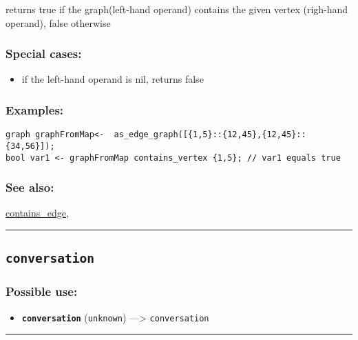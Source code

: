 \documentclass[]{book}
\providecommand{\tightlist}{%
  \setlength{\itemsep}{0pt}\setlength{\parskip}{0pt}}
\theoremstyle{definition}
\theoremstyle{definition}
\theoremstyle{definition}
\theoremstyle{remark}
\begin{document}
returns true if the graph(left-hand operand) contains the given vertex
(righ-hand operand), false otherwise

\subsubsection{Special cases:}\label{special-cases-36}

\begin{itemize}
\tightlist
\item
  if the left-hand operand is nil, returns false
\end{itemize}

\subsubsection{Examples:}\label{examples-80}

\begin{verbatim}
graph graphFromMap<-  as_edge_graph([{1,5}::{12,45},{12,45}::{34,56}]);  
bool var1 <- graphFromMap contains_vertex {1,5}; // var1 equals true
\end{verbatim}

\subsubsection{See also:}\label{see-also-66}

\href{OperatorsBC\#contains_edge}{contains\_edge},

\begin{center}\rule{0.5\linewidth}{\linethickness}\end{center}

\subsection{\texorpdfstring{\texttt{conversation}}{conversation}}\label{conversation}

\subsubsection{Possible use:}\label{possible-use-104}

\begin{itemize}
\tightlist
\item
  \textbf{\texttt{conversation}} (\texttt{unknown}) ---\textgreater{}
  \texttt{conversation}
\end{itemize}

\begin{center}\rule{0.5\linewidth}{\linethickness}\end{center}
\end{document}
